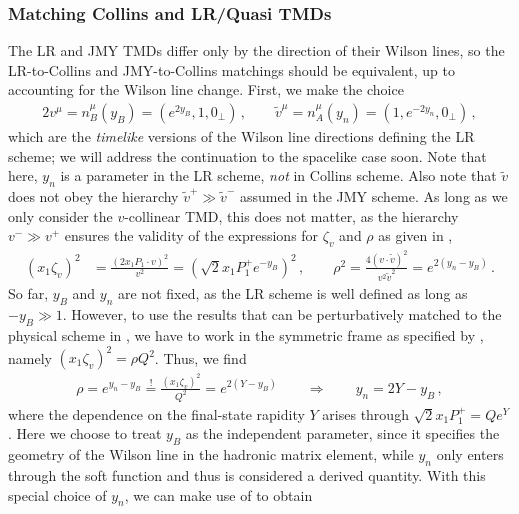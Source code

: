 \documentclass[11pt,a4paper]{article}
\newcommand{\tv}{{\tilde v}}
\newcommand{\nA}{n_A}
\newcommand{\nB}{n_B}
\begin{document}
\subsubsection{Matching Collins and LR/Quasi TMDs}

The LR and JMY TMDs differ only by the direction of their Wilson lines,
so the LR-to-Collins and JMY-to-Collins matchings should be equivalent,
up to accounting for the Wilson line change.
First, we make the choice
\begin{alignat}{2} \label{eq:v_LR}
 v^\mu = \nB^\mu(y_B) = (e^{2 y_B}, 1, 0_\perp)
\,,\qquad
 \tv^\mu = \nA^\mu(y_n) = (1, e^{-2 y_n}, 0_\perp)
\,,\end{alignat}
which are the \emph{timelike} versions of the Wilson line directions defining the LR scheme;
we will address the continuation to the spacelike case soon.
Note that here, $y_n$ is a parameter in the LR scheme, \emph{not} in Collins scheme.
Also note that $\tv$ does not obey the hierarchy $\tv^+ \gg \tv^-$ assumed in the JMY scheme.
As long as we only consider the $v$-collinear TMD, this does not matter,
as the hierarchy $v^- \gg v^+$ ensures the validity of the expressions for $\zeta_v$ and $\rho$ as given in ,
\begin{align} \label{eq:zeta_LR}
 (x_1 \zeta_v)^2 &
 = \frac{(2 x_1 P_1 \cdot v)^2}{v^2}
 = (\sqrt2 x_1 P_1^+ e^{-y_B})^2
\,,\qquad
 \rho^2
 = \frac{4 (v \cdot \tv)^2}{v^2 \tv^2}
 = e^{2 (y_n - y_B)}
\,.\end{align}
So far, $y_B$ and $y_n$ are not fixed, as the LR scheme is well defined as long as $-y_B \gg 1$.
However, to use the results that can be perturbatively matched to the physical scheme in ,
we have to work in the symmetric frame as specified by ,
namely $(x_1 \zeta_v)^2 = \rho Q^2$. Thus, we find
\begin{align} \label{eq:rho_relation}
 \rho = e^{y_n - y_B} \stackrel{!}{=} \frac{(x_1 \zeta_v)^2}{Q^2} = e^{2(Y - y_B)}
\qquad\Rightarrow\qquad
 y_n = 2Y - y_B
\,,\end{align}
where the dependence on the final-state rapidity $Y$ arises through $\sqrt2 x_1 P_1^+ = Q e^Y$.
Here we choose to treat $y_B$ as the independent parameter,
since it specifies the geometry of the Wilson line in the hadronic matrix element,
while $y_n$ only enters through the soft function and thus is considered a derived quantity.
With this special choice of $y_n$, we can make use of  to obtain
\end{document}
